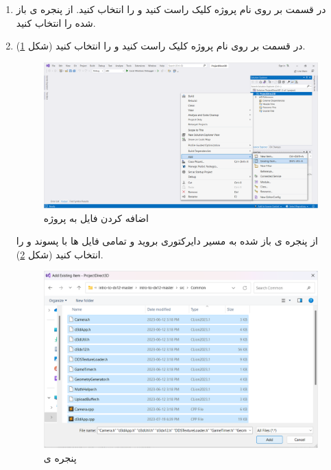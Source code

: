 {\begin{spacing}{1.3}
        \begin{enumerate}[label=\textbf{\arabic*}.]
            \item {در قسمت  بر روی نام پروژه کلیک راست کنید و  را انتخاب کنید.
            از پنجره ی باز شده  را انتخاب کنید.   }

            \item {در قسمت  بر روی نام پروژه کلیک راست کنید و  را انتخاب کنید (شکل \ref{fig:3.Intro.5.9.2}).

                \begin{figure}[H]
                    \centering
                    \setlength{\belowcaptionskip}{-10pt}
                    \includegraphics[width=\textwidth]{Images/3/3.Intro.5.9.2}
                    \caption{اضافه کردن فایل به پروژه}
                    \label{fig:3.Intro.5.9.2}
                \end{figure}

                از پنجره ی باز شده به مسیر دایرکتوری  بروید و تمامی فایل ها با پسوند  و  را انتخاب کنید  (شکل \ref{fig:3.Intro.5.9.3}).

                \begin{figure}[H]
                    \centering
                    \setlength{\belowcaptionskip}{-10pt}
                    \includegraphics[width=\textwidth]{Images/3/3.Intro.5.9.3}
                    \caption{پنجره ی }
                    \label{fig:3.Intro.5.9.3}
                \end{figure}

}
\end{enumerate}
\end{spacing}}
